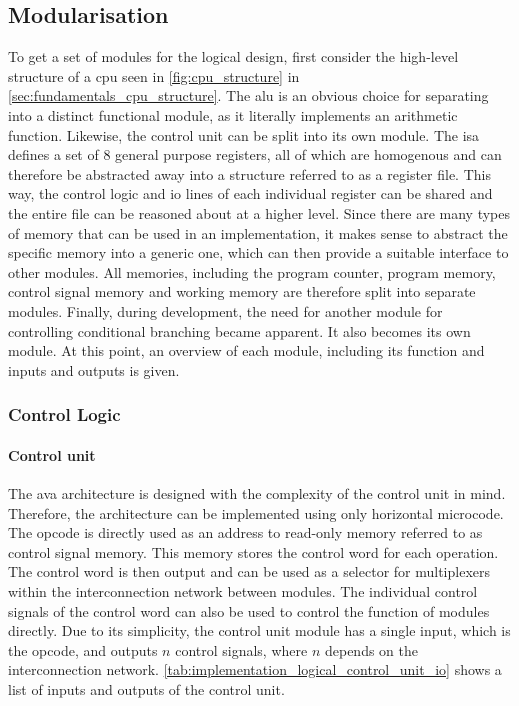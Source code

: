 \subsection{Modularisation} \label{sec:architecture_modularisation}

To get a set of modules for the logical design, first consider the high-level structure of a \ac{cpu} seen in \autoref{fig:cpu_structure} in \autoref{sec:fundamentals_cpu_structure}. The \ac{alu} is an obvious choice for separating into a distinct functional module, as it literally implements an arithmetic function. Likewise, the control unit can be 
split into its own module. The \ac{isa} defines a set of 8 general purpose registers, all of which are homogenous and can therefore be abstracted away into a structure referred to as a register file. This way, the control logic and \ac{io} lines of each individual register can be shared and the entire file can be reasoned about at a higher level. Since there are many types of memory that can be used in an implementation, it makes sense to abstract the specific memory into a generic one, which can then provide a suitable interface to other modules. All memories, including the program counter, program memory, control signal memory and working memory are therefore split into separate modules. Finally, during development, the need for another module for controlling conditional branching became apparent. It also becomes its own module. At this point, an overview of each module, including its function and inputs and outputs is given.

\subsubsection{Control Logic}

\paragraph*{Control unit}

The \ac{ava} architecture is designed with the complexity of the control unit in mind. Therefore, the architecture can be implemented using only horizontal microcode. The opcode is directly used as an address to read-only memory referred to as control signal memory. This memory stores the control word for each operation. The control word is then output and can be used as a selector for multiplexers within the interconnection network between modules. The individual control signals of the control word can also be used to control the function of modules directly. Due to its simplicity, the control unit module has a single input, which is the opcode, and outputs $n$ control signals, where $n$ depends on the interconnection network. \autoref{tab:implementation_logical_control_unit_io} shows a list of inputs and outputs of the control unit.

